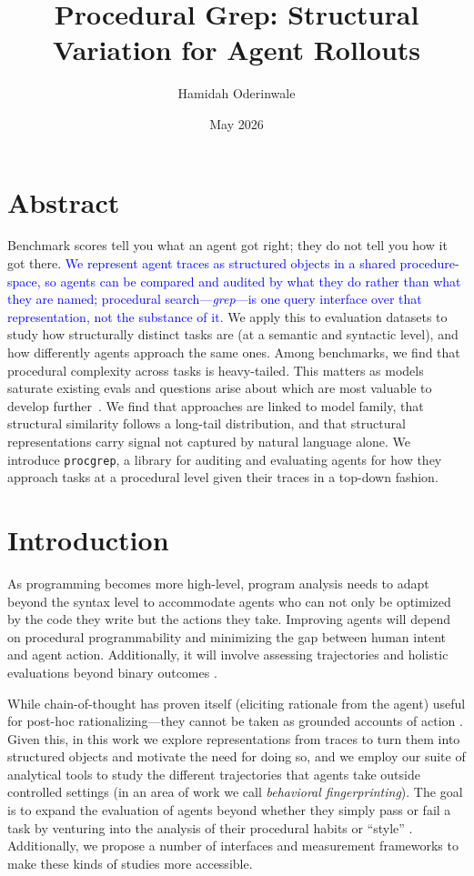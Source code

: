 \documentclass[11pt]{article}
\title{Procedural Grep: Structural Variation for Agent Rollouts}
\author{Hamidah Oderinwale}
\date{May 2026}
\begin{document}
\maketitle

  \section{Abstract}

  Benchmark scores tell you what an agent got right; they do not tell you how it got there.
  \textcolor{blue}{We represent agent traces as structured objects in a shared procedure-space,
  so agents can be compared and audited by what they do rather than what they are named;
  procedural search---\emph{grep}---is one query interface over that representation, not the
  substance of it.} We apply this to evaluation datasets to study how structurally distinct
  tasks are (at a semantic and syntactic level), and
  how differently agents approach the same ones.  Among benchmarks, we find that procedural complexity across tasks is heavy-tailed. This matters as models saturate existing evals and
  questions arise about which are most valuable to develop
  further~\cite{kiela-etal-2021-dynabench}. We find that approaches are linked
  to model family, that structural similarity follows a long-tail distribution,
  and that structural representations carry signal not captured by natural
  language alone. We introduce \texttt{procgrep}, a library for auditing and evaluating agents for how they approach tasks at a procedural level given their traces in a top-down fashion.

\section{Introduction}
As programming becomes more high-level, program analysis needs to adapt beyond the syntax level to accommodate agents who can not only be optimized by the code they write but the actions they take. Improving agents will depend on procedural programmability and minimizing the gap between human intent and agent action. Additionally, it will involve assessing trajectories and holistic evaluations beyond binary outcomes \cite{haupt2025position}.

While chain-of-thought has proven itself (eliciting rationale from the agent) useful for post-hoc rationalizing---they cannot be taken as grounded accounts of action \cite{wei2023chainofthoughtpromptingelicitsreasoning,    ross2025modelingstudentlearning38, guan2025monitoringmonitorability}. Given this, in this work we explore representations from traces to turn them into structured objects and motivate the need for doing so, and we employ our suite of analytical tools to study the different trajectories that agents take outside controlled settings (in an area of work we call \emph{behavioral fingerprinting}). The goal is to expand the evaluation of agents beyond whether they simply pass or fail a task by venturing into the analysis of their procedural habits or ``style'' \cite{bisztray2025iknowllmwrote}. Additionally, we propose a number of interfaces and measurement frameworks to make these kinds of studies more accessible.
\end{document}
